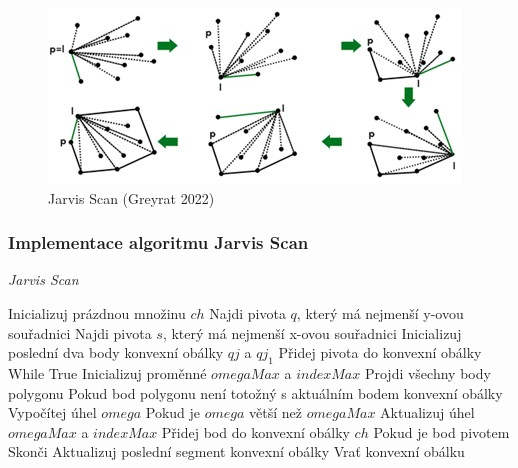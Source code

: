 \documentclass{article}
\begin{document}
\begin{spacing}{1.5}
\begin{figure}[h]
    \centering
    \includegraphics[width=0.75\linewidth]{images/jarvis.jpg}
    \caption{Jarvis Scan (Greyrat 2022)}
    \label{fig:enter-label}
\end{figure}

\subsubsection*{Implementace algoritmu Jarvis Scan}
\begin{algorithm}
    \caption {\textit{Jarvis Scan}}
    \begin{algorithmic}[1]
        \State Inicializuj prázdnou množinu $ch$
        \State Najdi pivota $q$, který má nejmenší y-ovou souřadnici
        \State Najdi pivota $s$, který má nejmenší x-ovou souřadnici
        \State  Inicializuj poslední dva body konvexní obálky $qj$ a $qj_1$
        \State Přidej pivota do konvexní obálky
        \State While True
        \State \indent Inicializuj proměnné $omegaMax$ a $indexMax$
        \State \indent Projdi všechny body polygonu
        \State \indent \indent Pokud bod polygonu není totožný s aktuálním bodem konvexní obálky
        \State \indent \indent \indent Vypočítej úhel $omega$
        \State \indent \indent \indent Pokud je $omega$ větší než $omegaMax$
        \State \indent \indent \indent Aktualizuj úhel $omegaMax$ a $indexMax$
        \State \indent Přidej bod do konvexní obálky $ch$
        \State \indent Pokud je bod pivotem
        \State \indent \indent Skonči
        \State \indent Aktualizuj poslední segment konvexní obálky
        \State  Vrať konvexní obálku
    \end{algorithmic}
\end{algorithm}


\end{spacing}
\end{document}
